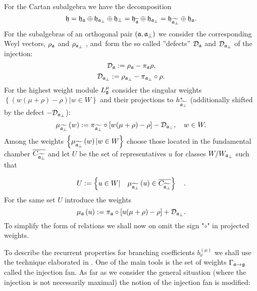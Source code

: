For the Cartan subalgebra we have the decomposition
\begin{equation}
\frak{h}=\frak{\frak{h}_{\af}}\oplus \frak{h}_{\af_{\perp }}\oplus
\frak{h}_{\perp }=\frak{\frak{h}_{\widetilde{\af}}}\oplus \frak{h}_{%
\af_{\perp }}=\frak{\frak{h}_{\widetilde{\af_{\perp }}}}\oplus
\frak{h}_{\af}.
\end{equation}
For the subalgebras of an orthogonal pair $\left( \mathfrak{a},\mathfrak{a}_{\perp
}\right) $ we consider the corresponding Weyl vectors, $\rho _{\mathfrak{a}}$
and $\rho _{\mathfrak{a}_{\perp }}$ , and\ form the so called ''defects'' $%
\mathcal{D}_{\af}$ and $\mathcal{D}_{\mathfrak{a}_{\perp }}$ of the
injection:
\begin{equation}
\mathcal{D}_{\mathfrak{a}}:=\rho _{\mathfrak{a}}-\pi _{\mathfrak{a}}\rho ,
\end{equation}
\begin{equation}
\label{defect-perp}
\mathcal{D}_{\af_{\perp }}:=\rho _{\af_{\perp }}-\pi _{\af%
_{\perp }}\circ\rho .
\end{equation}
For the highest weight module $L_{\frak{g}}^{\mu }$ consider the singular
weights $\left\{\left( w(\mu +\rho )-\rho \right)|w  \in W \right\}$ and
their projections to $h_{\widetilde{\mathfrak{a}_{\perp }}}^{\ast }$ (additionally
shifted by the defect $-\mathcal{D}_{\mathfrak{a}_{\perp }}$):
\begin{equation*}
\mu _{\widetilde{\af_{\perp }}}\left( w\right) :=\pi _{\widetilde{\frak{%
a}_{\perp }}}\circ\left[ w(\mu +\rho )-\rho \right] -\mathcal{D}_{\af_{\perp
}},\quad w\in W.
\end{equation*}
Among the weights $\left\{\mu _{\widetilde{\mathfrak{a}_{\perp }}}\left( w\right)
|w\in W\right\}$ choose those located in the fundamental chamber $\overline{C_{%
\widetilde{\af_{\perp }}}}$ and let $U$ be the set of representatives $%
u $ for classes $W/W_{\mathfrak{a}_{\perp }}$ such that

\begin{equation}
U:=\left\{ u\in W|\quad \mu _{\widetilde{\mathfrak{a}_{\perp }}}\left( u\right)
\in \overline{C_{\widetilde{\mathfrak{a}_{\perp }}}}\right\} \quad .
\label{U-def}
\end{equation}
For the same set $U$ introduce the weights
\begin{equation*}
\mu _{\af}\left( u\right) :=\pi _{\af}\circ\left[ u(\mu +\rho )-\rho %
\right] +\mathcal{D}_{\af_{\perp }}.
\end{equation*}
To simplify the form of relations we shall now on omit the sign "$\circ$" in projected
weights.


To describe the recurrent properties for branching coefficients $b_{\nu
}^{(\mu )}$ we shall use the technique elaborated in \cite{ilyin812pbc}. One of the
main tools is the set of weights $\Gamma _{\af\rightarrow \frak{g}%
} $ called the injection fan. As far as we consider the general situation
(where the injection is not necessarily maximal) the notion of the injection fan is
modified:

